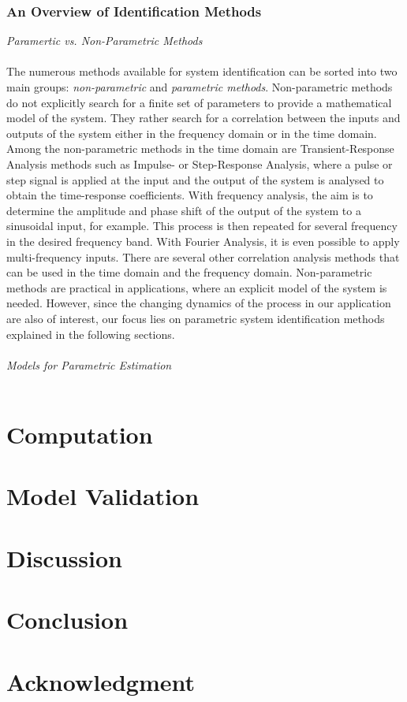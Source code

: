 \documentclass[9pt, twoside]{article}
\begin{document}
\begin{multicols}{2}
 \subsubsection{An Overview of Identification Methods}
\textit{Paramertic vs. Non-Parametric Methods}\\
\\
 The numerous methods available for system identification can be sorted into two main groups: \textit{non-parametric} and \textit{parametric methods}. Non-parametric methods do not explicitly search for a finite set of parameters to provide a mathematical model of the system. They rather search for a correlation between the inputs and outputs of the system either in the frequency domain or in the time domain. Among the non-parametric methods in the time domain are Transient-Response Analysis methods such as Impulse- or Step-Response Analysis, where a pulse or step signal is applied at the input and the output of the system is analysed to obtain the time-response coefficients. With frequency analysis, the aim is to determine the amplitude and phase shift of the output of the system to a sinusoidal input, for example. This process is then repeated for several frequency in the desired frequency band. With Fourier Analysis, it is even possible to apply multi-frequency inputs. There are several other correlation analysis methods that can be used in the time domain and the frequency domain. Non-parametric methods are practical in applications, where an explicit model of the system is needed. However, since the changing dynamics of the process in our application are also of interest, our focus lies on parametric system identification methods explained in the following sections.\\
 \\
 \textit{Models for Parametric Estimation}\\
 \\

 
 

\section{Computation}

\section{Model Validation}

\section{Discussion}


\section{Conclusion}


\section*{Acknowledgment}








\end{multicols}
{}

\end{document}
